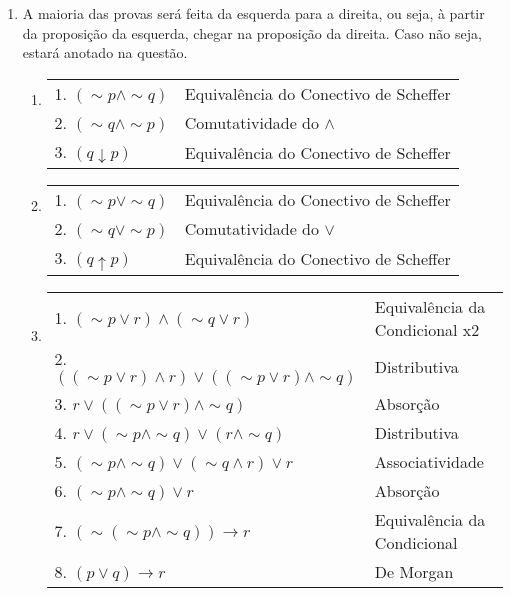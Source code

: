 \documentclass[12pt, a4paper,final]{article}
\begin{document}
    \begin{enumerate}
        \setlength {\itemindent}{-2cm}
        
        \item A maioria das provas será feita da esquerda para a direita, ou seja, à partir da proposição da esquerda, chegar na proposição da direita. Caso não seja, estará anotado na questão.
        
        \begin{enumerate}[label=(\alph*)]
            \setlength \itemsep{1em}
            \setlength {\itemindent}{-2cm}
        
            \item 
            
                \begin{tabular}{ll}
                    1. $(\sim p \wedge \sim q) $ & Equivalência do Conectivo de Scheffer \\
                    2. $(\sim q \wedge \sim p) $ & Comutatividade do $\wedge$ \\
                    3. $(q \downarrow p) $ & Equivalência do Conectivo de Scheffer \\
                \end{tabular}
            
            \item 
            
                \begin{tabular}{ll}
                    1. $(\sim p \vee \sim q)$ & Equivalência do Conectivo de Scheffer \\
                    2. $(\sim q \vee \sim p)$ & Comutatividade do $\vee$ \\
                    3. $(q \uparrow p)$ & Equivalência do Conectivo de Scheffer
                \end{tabular}
            
            \item 
            
                \begin{tabular}{ll}
                    1. $(\sim p \vee r) \wedge (\sim q \vee r)$ & Equivalência da Condicional x2 \\
                    2. $((\sim p \vee r)\wedge r) \vee ((\sim p \vee r)\wedge \sim q)$ & Distributiva \\
                    3. $r \vee ((\sim p \vee r)\wedge \sim q)$ & Absorção \\
                    4. $r \vee (\sim p \wedge \sim q) \vee (r \wedge \sim q)$ & Distributiva\\
                    5. $(\sim p \wedge \sim q) \vee (\sim q \wedge r) \vee r$ & Associatividade\\
                    6. $(\sim p \wedge \sim q) \vee r $ & Absorção \\
                    7. $(\sim(\sim p \wedge \sim q))\rightarrow r$ & Equivalência da Condicional\\
                    8. $(p \vee q) \rightarrow r$ & De Morgan\\
                \end{tabular}
            

\end{enumerate}
\end{enumerate}
\end{document}
